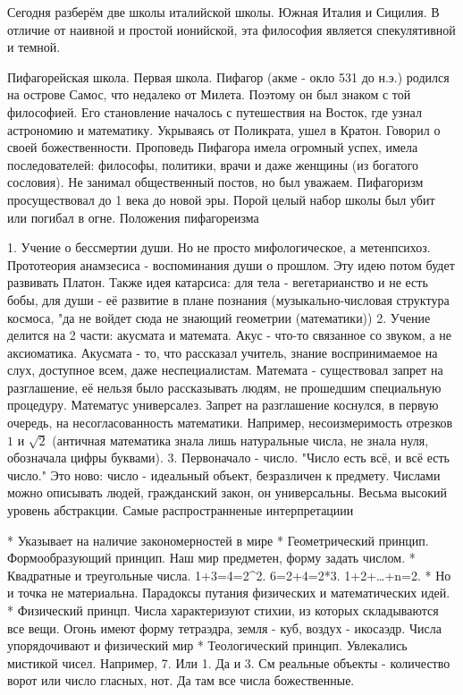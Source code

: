 Сегодня разберём две школы италийской школы. Южная Италия и Сицилия.
В отличие от наивной и простой ионийской, эта философия является спекулятивной и темной.

Пифагорейская школа.
Первая школа.
Пифагор (акме - окло 531 до н.э.) родился на острове Самос, что недалеко от Милета. Поэтому он был знаком с той философией. 
Его становление началось с путешествия на Восток, где узнал астрономию и математику. Укрываясь от Поликрата, ушел в Кратон. Говорил о своей божественности.
Проповедь Пифагора имела огромный успех, имела последователей: философы, политики, врачи и даже женщины (из богатого сословия). Не занимал общественный постов, но был уважаем.
Пифагоризм просуществовал до 1 века до новой эры. Порой целый набор школы был убит или погибал в огне.
Положения пифагореизма

	1. Учение о бессмертии души. Но не просто мифологическое, а метенпсихоз. Прототеория анамзесиса - воспоминания души о прошлом. Эту идею потом будет развивать Платон. 
	Также идея катарсиса: для тела - вегетарианство и не есть бобы, для души - её развитие в плане познания (музыкально-числовая структура космоса, "да не войдет сюда не знающий геометрии (математики))
	2. Учение делится на 2 части: акусмата и математа. Акус - что-то связанное со звуком, а не аксиоматика. Акусмата - то, что рассказал учитель, знание воспринимаемое на слух, доступное всем, даже неспециалистам. Математа - существовал запрет на разглашение, её нельзя было рассказывать людям, не прошедшим специальную процедуру. 
	Математус универсалез. Запрет на разглашение коснулся, в первую очередь, на несогласованность математики. 
	Например, несоизмеримость отрезков $1$ и $\sqrt{2}$ (античная математика знала лишь натуральные числа, не знала нуля, обозначала цифры буквами).
	3. Первоначало - число. "Число есть всё, и всё есть число." Это ново: число - идеальный объект, безразличен к предмету. 
	Числами можно описывать людей, гражданский закон, он универсальны. Весьма высокий уровень абстракции. Самые распространненые интерпретациии


	* Указывает на наличие закономерностей в мире
	* Геометрический принцип. Формообразующий принцип. Наш мир предметен, форму задать числом.
	* Квадратные и треугольные числа. 1+3=4=2^2. 6=2+4=2*3. 1+2+\ldots+n=2.
	* Но и точка не материальна. Парадоксы путания физических и математических идей.
	* Физический принцп. Числа характеризуют стихии, из которых складываются все вещи. Огонь имеют форму тетраэдра, земля - куб, воздух - икосаэдр. Числа упорядочивают и физический мир
	* Теологический принцип. Увлекались мистикой чисел. Например, 7. Или 1. Да и 3. См реальные объекты - количество ворот или число гласных, нот. Да там все числа божественные.

